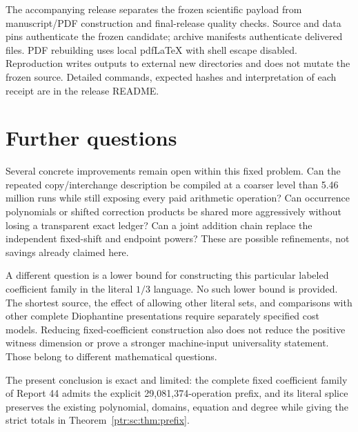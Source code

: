 \documentclass[11pt,letterpaper]{article}
\theoremstyle{definition}\newtheorem{definition}[theorem]{Definition}
\theoremstyle{remark}\newtheorem{remark}[theorem]{Remark}
\begin{document}
The accompanying release separates the frozen scientific payload from manuscript/PDF construction and final-release quality checks. Source and data pins authenticate the frozen candidate; archive manifests authenticate delivered files. PDF rebuilding uses local pdfLaTeX with shell escape disabled. Reproduction writes outputs to external new directories and does not mutate the frozen source. Detailed commands, expected hashes and interpretation of each receipt are in the release README.

\section{Further questions}\label{ptr:sc:sec:further}
Several concrete improvements remain open within this fixed problem. Can the repeated copy/interchange description be compiled at a coarser level than 5.46 million runs while still exposing every paid arithmetic operation? Can occurrence polynomials or shifted correction products be shared more aggressively without losing a transparent exact ledger? Can a joint addition chain replace the independent fixed-shift and endpoint powers? These are possible refinements, not savings already claimed here.

A different question is a lower bound for constructing this particular labeled coefficient family in the literal $1/3$ language. No such lower bound is provided. The shortest source, the effect of allowing other literal sets, and comparisons with other complete Diophantine presentations require separately specified cost models. Reducing fixed-coefficient construction also does not reduce the positive witness dimension or prove a stronger machine-input universality statement. Those belong to different mathematical questions.

The present conclusion is exact and limited: the complete fixed coefficient family of Report 44 admits the explicit 29,081,374-operation prefix, and its literal splice preserves the existing polynomial, domains, equation and degree while giving the strict totals in Theorem~\ref{ptr:sc:thm:prefix}.
\end{document}
